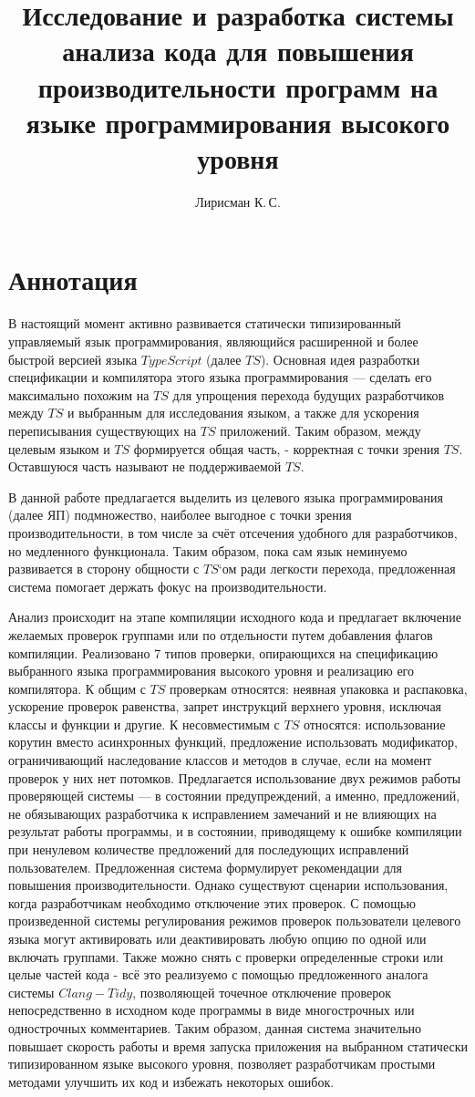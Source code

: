 \documentclass{mipt-thesis-bs}
\title{Исследование и разработка системы анализа кода для повышения производительности программ на языке программирования высокого уровня}
\author{Лирисман К.\,С.}
\begin{document}
\titlecontents
\chapter{Аннотация}

В настоящий момент активно развивается статически типизированный управляемый язык
программирования, являющийся расширенной и более быстрой версией языка $TypeScript$ (далее $TS$).
Основная идея разработки спецификации и компилятора этого языка программирования — сделать его максимально
похожим на $TS$ для упрощения перехода будущих разработчиков между $TS$ и
выбранным для исследования языком, а также для ускорения переписывания существующих на $TS$ приложений.
Таким образом, между целевым языком и $TS$ формируется общая часть, - корректная с точки зрения $TS$.
Оставшуюся часть называют не поддерживаемой $TS$.

В данной работе предлагается выделить из целевого языка программирования (далее ЯП) подмножество,
наиболее выгодное с точки зрения производительности,
в том числе за счёт отсечения удобного для разработчиков, но медленного функционала. Таким образом, пока сам язык неминуемо
развивается в сторону общности с $TS$`ом ради легкости перехода, предложенная система помогает держать фокус
на производительности.

Анализ происходит на этапе компиляции исходного кода и предлагает включение желаемых
проверок группами или по отдельности путем добавления флагов компиляции. Реализовано
7 типов проверки, опирающихся на спецификацию выбранного языка
программирования высокого уровня и реализацию его компилятора. К общим с $TS$ проверкам относятся:
неявная упаковка и распаковка, ускорение проверок равенства, запрет инструкций верхнего уровня, исключая
классы и функции и другие. К несовместимым с $TS$ относятся: использование корутин вместо асинхронных функций,
предложение использовать модификатор, ограничивающий наследование классов и методов в случае, если на
момент проверок у них нет потомков.
Предлагается использование двух режимов работы проверяющей системы — в состоянии
предупреждений, а именно, предложений, не обязывающих разработчика к исправлением замечаний и не
влияющих на результат работы программы, и в состоянии, приводящему к ошибке компиляции при ненулевом количестве
предложений для последующих исправлений пользователем.
Предложенная система формулирует рекомендации для повышения производительности. Однако
существуют сценарии использования, когда разработчикам необходимо отключение этих проверок.
С помощью произведенной системы регулирования режимов проверок пользователи целевого языка
могут активировать или деактивировать любую опцию по одной или включать группами.
Также можно снять с проверки определенные строки или целые частей кода - всё это реализуемо с помощью
предложенного аналога системы $Clang-Tidy$, позволяющей точечное отключение проверок непосредственно
в исходном коде программы в виде многострочных или однострочных комментариев.
Таким образом, данная система значительно повышает скорость работы и время запуска
приложения на выбранном статически типизированном языке высокого уровня, позволяет разработчикам
простыми методами улучшить их код и избежать некоторых ошибок.
\end{document}
